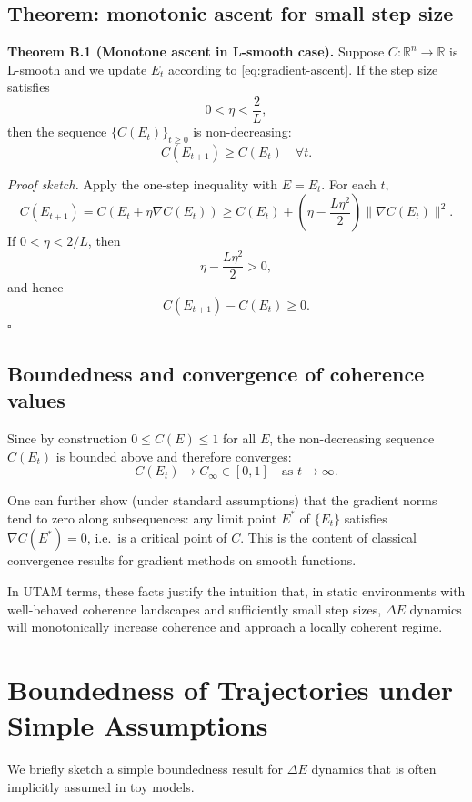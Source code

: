 \documentclass[12pt,a4paper]{report}
\begin{document}
\subsection*{Theorem: monotonic ascent for small step size}

\textbf{Theorem B.1 (Monotone ascent in L-smooth case).}
Suppose \(C : \mathbb{R}^n \to \mathbb{R}\) is L-smooth and we update \(E_t\) according to \eqref{eq:gradient-ascent}. If the step size satisfies
\[
    0 < \eta < \frac{2}{L},
\]
then the sequence \(\{C(E_t)\}_{t \ge 0}\) is non-decreasing:
\[
    C(E_{t+1}) \ge C(E_t) \quad \forall t.
\]

\emph{Proof sketch.}
Apply the one-step inequality with \(E = E_t\). For each \(t\),
\[
    C(E_{t+1})
    = C(E_t + \eta \nabla C(E_t))
    \ge C(E_t) + \left(\eta - \frac{L\eta^2}{2}\right) \|\nabla C(E_t)\|^2.
\]
If \(0 < \eta < 2/L\), then
\[
    \eta - \frac{L\eta^2}{2} > 0,
\]
and hence
\[
    C(E_{t+1}) - C(E_t) \ge 0.
\]
\hfill\(\square\)

\subsection*{Boundedness and convergence of coherence values}

Since by construction \(0 \le C(E) \le 1\) for all \(E\), the non-decreasing sequence \(C(E_t)\) is bounded above and therefore converges:
\[
    C(E_t) \to C_\infty \in [0,1] \quad \text{as } t \to \infty.
\]

One can further show (under standard assumptions) that the gradient norms tend to zero along subsequences: any limit point \(E^\ast\) of \(\{E_t\}\) satisfies \(\nabla C(E^\ast) = 0\), i.e.\ is a critical point of \(C\). This is the content of classical convergence results for gradient methods on smooth functions.

In UTAM terms, these facts justify the intuition that, in static environments with well-behaved coherence landscapes and sufficiently small step sizes, $\Delta E$ dynamics will monotonically increase coherence and approach a locally coherent regime.

\section{Boundedness of Trajectories under Simple Assumptions}

We briefly sketch a simple boundedness result for $\Delta E$ dynamics that is often implicitly assumed in toy models.
\end{document}
